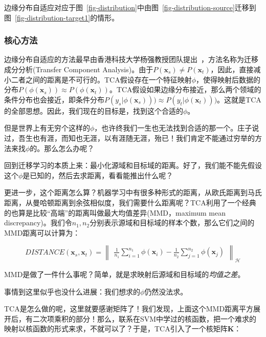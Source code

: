 边缘分布自适应对应于图~\ref{fig-distribution}中由图~\ref{fig-distribution-source}迁移到图~\ref{fig-distribution-target1}的情形。

\subsubsection{核心方法}

边缘分布自适应的方法最早由香港科技大学杨强教授团队提出~\cite{pan2011domain}，方法名称为迁移成分分析(Transfer Component Analysis)。由于$P(\mathbf{x}_s) \ne P(\mathbf{x}_t)$，因此，直接减小二者之间的距离是不可行的。TCA假设存在一个特征映射$\phi$，使得映射后数据的分布$P(\phi(\mathbf{x}_s)) \approx P(\phi(\mathbf{x}_t))$。TCA假设如果边缘分布接近，那么两个领域的条件分布也会接近，即条件分布$P(y_s | \phi(\mathbf{x}_s))) \approx P(y_t | \phi(\mathbf{x}_t)))$。这就是TCA的全部思想。因此，我们现在的目标是，找到这个合适的$\phi$。

但是世界上有无穷个这样的$\phi$，也许终我们一生也无法找到合适的那一个。庄子说过，吾生也有涯，而知也无涯，以有涯随无涯，殆已！我们肯定不能通过穷举的方法来找$\phi$的。那么怎么办呢？

回到迁移学习的本质上来：最小化源域和目标域的距离。好了，我们能不能先假设这个$\phi$是已知的，然后去求距离，看看能推出什么呢？

更进一步，这个距离怎么算？机器学习中有很多种形式的距离，从欧氏距离到马氏距离，从曼哈顿距离到余弦相似度，我们需要什么距离呢？TCA利用了一个经典的也算是比较“高端”的距离叫做最大均值差异(MMD，maximum mean discrepancy)。我们令$n_1,n_2$分别表示源域和目标域的样本个数，那么它们之间的MMD距离可以计算为：

\begin{equation}
	\label{eq-distribution-mmd}
	DISTANCE(\mathbf{x}_{s},\mathbf{x}_{t})= \begin{Vmatrix} \frac{1}{n_1} \sum \limits_{i=1}^{n_1} \phi(\mathbf{x}_{i}) - \frac{1}{n_2}\sum \limits _{j=1}^{n_2} \phi(\mathbf{x}_{j}) \end{Vmatrix}_{\mathcal{H}}
\end{equation}

MMD是做了一件什么事呢？简单，就是求映射后源域和目标域的\textit{均值之差}。

事情到这里似乎也没什么进展：我们想求的$\phi$仍然没法求。

TCA是怎么做的呢，这里就要感谢矩阵了！我们发现，上面这个MMD距离平方展开后，有二次项乘积的部分！那么，联系在SVM中学过的核函数，把一个难求的映射以核函数的形式来求，不就可以了？于是，TCA引入了一个核矩阵$\mathbf{K}$：

